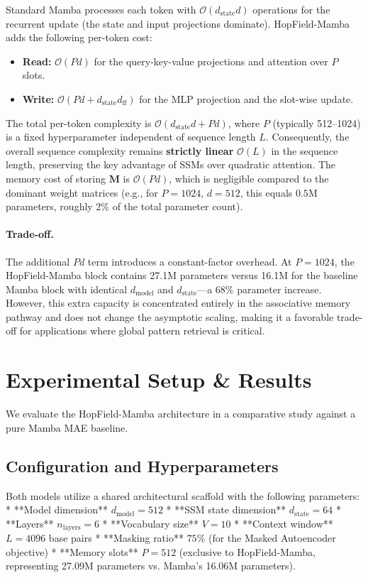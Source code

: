 \documentclass[journal,10pt]{IEEEtran}
\begin{document}
Standard Mamba processes each token with $\mathcal{O}(d_{\text{state}} d)$ operations for the recurrent update (the state and input projections dominate). HopField-Mamba adds the following per-token cost:

\begin{itemize}
    \item \textbf{Read:} $\mathcal{O}(P d)$ for the query-key-value projections and attention over $P$ slots.
    \item \textbf{Write:} $\mathcal{O}(P d + d_{\text{state}} d_{\text{ff}})$ for the MLP projection and the slot-wise update.
\end{itemize}

The total per-token complexity is $\mathcal{O}(d_{\text{state}} d + P d)$, where $P$ (typically 512--1024) is a fixed hyperparameter independent of sequence length $L$. Consequently, the overall sequence complexity remains \textbf{strictly linear} $\mathcal{O}(L)$ in the sequence length, preserving the key advantage of SSMs over quadratic attention. The memory cost of storing $\bm{M}$ is $\mathcal{O}(P d)$, which is negligible compared to the dominant weight matrices (e.g., for $P=1024$, $d=512$, this equals $0.5$M parameters, roughly 2\% of the total parameter count).

\paragraph{Trade-off.}
The additional $P d$ term introduces a constant-factor overhead. At $P=1024$, the HopField-Mamba block contains 27.1M parameters versus 16.1M for the baseline Mamba block with identical $d_{\text{model}}$ and $d_{\text{state}}$---a 68\% parameter increase. However, this extra capacity is concentrated entirely in the associative memory pathway and does not change the asymptotic scaling, making it a favorable trade-off for applications where global pattern retrieval is critical.

\section{Experimental Setup \& Results}
\label{sec:experiments}

We evaluate the HopField-Mamba architecture in a comparative study against a pure Mamba MAE baseline.

\subsection{Configuration and Hyperparameters}
Both models utilize a shared architectural scaffold with the following parameters:
* **Model dimension** $d_{\text{model}} = 512$
* **SSM state dimension** $d_{\text{state}} = 64$
* **Layers** $n_{\text{layers}} = 6$
* **Vocabulary size** $V = 10$
* **Context window** $L = 4096$ base pairs
* **Masking ratio** $75\%$ (for the Masked Autoencoder objective)
* **Memory slots** $P = 512$ (exclusive to HopField-Mamba, representing 27.09M parameters vs. Mamba's 16.06M parameters).
\end{document}
